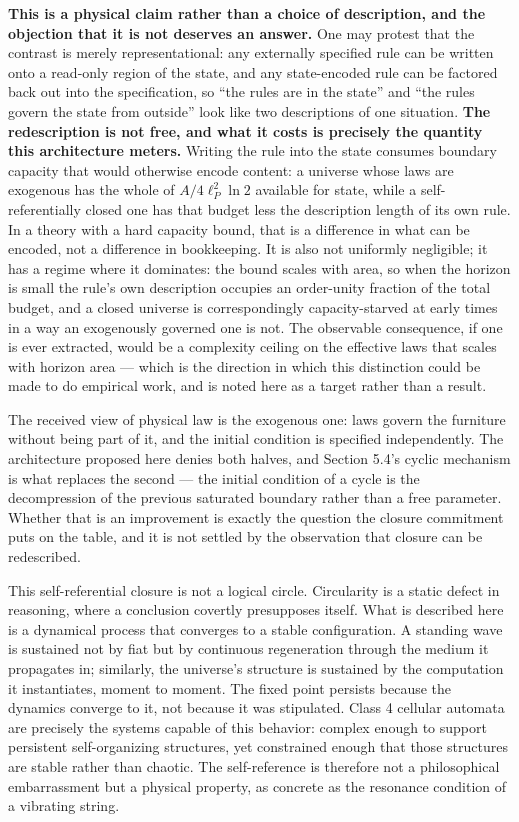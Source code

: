 \documentclass[
]{article}
\begin{document}
\textbf{This is a physical claim rather than a choice of description,
and the objection that it is not deserves an answer.} One may protest
that the contrast is merely representational: any externally specified
rule can be written onto a read-only region of the state, and any
state-encoded rule can be factored back out into the specification, so
``the rules are in the state'' and ``the rules govern the state from
outside'' look like two descriptions of one situation. \textbf{The
redescription is not free, and what it costs is precisely the quantity
this architecture meters.} Writing the rule into the state consumes
boundary capacity that would otherwise encode content: a universe whose
laws are exogenous has the whole of \(A/4\ell_P^2 \ln 2\) available for
state, while a self-referentially closed one has that budget less the
description length of its own rule. In a theory with a hard capacity
bound, that is a difference in what can be encoded, not a difference in
bookkeeping. It is also not uniformly negligible; it has a regime where
it dominates: the bound scales with area, so when the horizon is small
the rule's own description occupies an order-unity fraction of the total
budget, and a closed universe is correspondingly capacity-starved at
early times in a way an exogenously governed one is not. The observable
consequence, if one is ever extracted, would be a complexity ceiling on
the effective laws that scales with horizon area --- which is the
direction in which this distinction could be made to do empirical work,
and is noted here as a target rather than a result.

The received view of physical law is the exogenous one: laws govern the
furniture without being part of it, and the initial condition is
specified independently. The architecture proposed here denies both
halves, and Section 5.4's cyclic mechanism is what replaces the second
--- the initial condition of a cycle is the decompression of the
previous saturated boundary rather than a free parameter. Whether that
is an improvement is exactly the question the closure commitment puts on
the table, and it is not settled by the observation that closure can be
redescribed.

This self-referential closure is not a logical circle. Circularity is a
static defect in reasoning, where a conclusion covertly presupposes
itself. What is described here is a dynamical process that converges to
a stable configuration. A standing wave is sustained not by fiat but by
continuous regeneration through the medium it propagates in; similarly,
the universe's structure is sustained by the computation it
instantiates, moment to moment. The fixed point persists because the
dynamics converge to it, not because it was stipulated. Class 4 cellular
automata are precisely the systems capable of this behavior: complex
enough to support persistent self-organizing structures, yet constrained
enough that those structures are stable rather than chaotic. The
self-reference is therefore not a philosophical embarrassment but a
physical property, as concrete as the resonance condition of a vibrating
string.
\end{document}
